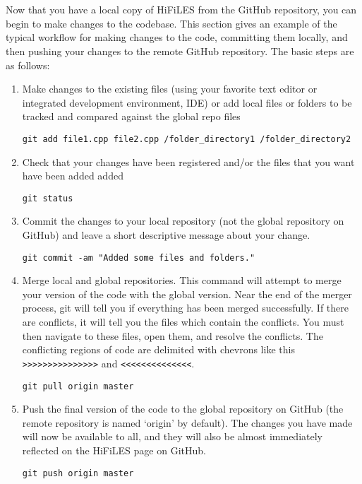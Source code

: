 \documentclass[letter,10pt]{article}
\newcommand*{\TitleFont}{%
      \usefont{\encodingdefault}{\rmdefault}{b}{n}%
      \fontsize{10}{20}%
      \selectfont}
\begin{document}
\section*{\TitleFont{Typical Workflow with Git}}

Now that you have a local copy of HiFiLES from the GitHub repository, you can begin to make changes to the codebase. This section gives an example of the typical workflow for making changes to the code, committing them locally, and then pushing your changes to the remote GitHub repository. The basic steps are as follows:

\begin{enumerate}
 
 \item Make changes to the existing files (using your favorite text editor or integrated development environment, IDE) or add local files or folders to be tracked and compared against the global repo files
\begin{verbatim}
git add file1.cpp file2.cpp /folder_directory1 /folder_directory2
\end{verbatim}

\item Check that your changes have been registered and/or the files that you want have been added added
\begin{verbatim}
git status 
\end{verbatim}\hline

\item Commit the changes to your local repository (not the
global repository on GitHub) and leave a short descriptive message about your change. 
\begin{verbatim}
git commit -am "Added some files and folders."
\end{verbatim}

\item Merge local and global repositories.
 This command will attempt to merge your version of the code with the global
version. Near the end of the merger process, git will tell you if everything has
been merged successfully. If there are conflicts, it will tell you the files
which contain the conflicts. You must then navigate to these files, open them,
and resolve the conflicts. The conflicting regions of code are delimited with
chevrons like this \texttt{>>>>>>>>>>>>>>>} and \texttt{<<<<<<<<<<<<<<}.
\begin{verbatim}
git pull origin master
\end{verbatim}

\item Push the final version of the code to the global repository on GitHub (the remote repository is named `origin' by default). The changes you have made will now be available to all, and they will also be almost immediately reflected on the HiFiLES page on GitHub.
\begin{verbatim}
git push origin master 
\end{verbatim}

\end{enumerate}
\end{document}
